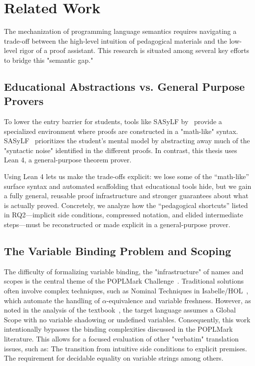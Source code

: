 

%
%
%
%
%
%
\chapter{Related Work}
The mechanization of programming language semantics requires navigating a
trade-off between the high-level intuition of pedagogical materials and the
low-level rigor of a proof assistant. This research is situated among several
key efforts to bridge this "semantic gap."

%
%
%
\section{Educational Abstractions vs. General Purpose Provers}
To lower the entry barrier for students, tools like
SASyLF by~\cite{SASyLF} provide a specialized environment where proofs are constructed in a
"math-like" syntax. SASyLF~\citep{SASyLF}
prioritizes the student's mental model by
abstracting away much of the "syntactic noise" identified in the different proofs.
In contrast, this thesis uses Lean 4, a general-purpose theorem prover.

Using Lean 4 lets us make the trade-offs explicit: we lose some of the
``math-like'' surface syntax and automated scaffolding that educational tools hide,
but we gain a fully general, reusable proof infrastructure and stronger guarantees
about what is actually proved. Concretely, we analyze how the ``pedagogical
shortcuts'' listed in RQ2—implicit side conditions, compressed notation, and
elided intermediate steps—must be reconstructed or made explicit in a
general-purpose prover.

%
%
%
\section{The Variable Binding Problem and Scoping}
The difficulty of formalizing
variable binding, the "infrastructure" of names and scopes is the central
theme of the POPLMark Challenge~\citep{aydemir_mechanized_2005}. Traditional solutions often involve complex
techniques, such as Nominal Techniques in Isabelle/HOL~\citep{urban_nominal_Isabelle_2008}, which automate the
handling of $\alpha$-equivalence and variable freshness. However, as noted in
the analysis of the textbook~\citep{nielson_semantics_2007}, the target language assumes a Global
Scope with no variable shadowing or undefined variables. Consequently, this
work intentionally bypasses the binding complexities discussed in the POPLMark~\citep{aydemir_mechanized_2005} 
literature. This allows for a focused evaluation of other "verbatim" translation
issues, such as:
The transition from intuitive side conditions to explicit premises.
The requirement for decidable equality on variable strings among others.

